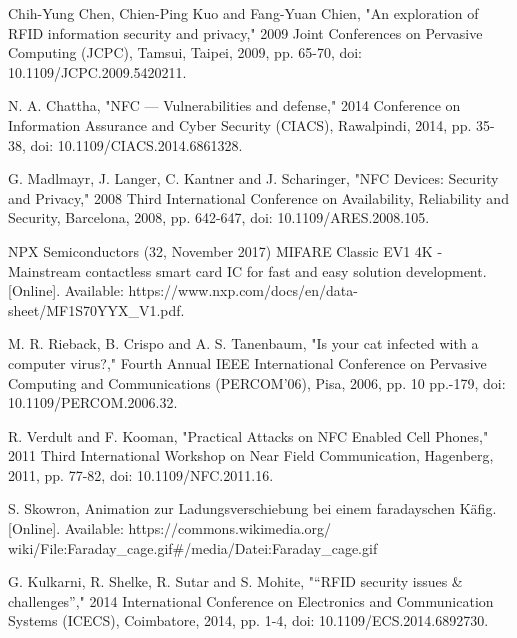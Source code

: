 \documentclass[conference]{IEEEtran}
\begin{document}
\begin{thebibliography}{00}
 Chih-Yung Chen, Chien-Ping Kuo and Fang-Yuan Chien, "An exploration of RFID information security and privacy," 2009 Joint Conferences on Pervasive Computing (JCPC), Tamsui, Taipei, 2009, pp. 65-70, doi: 10.1109/JCPC.2009.5420211.

 N. A. Chattha, "NFC — Vulnerabilities and defense," 2014 Conference on Information Assurance and Cyber Security (CIACS), Rawalpindi, 2014, pp. 35-38, doi: 10.1109/CIACS.2014.6861328.

 G. Madlmayr, J. Langer, C. Kantner and J. Scharinger, "NFC Devices: Security and Privacy," 2008 Third International Conference on Availability, Reliability and Security, Barcelona, 2008, pp. 642-647, doi: 10.1109/ARES.2008.105.

 NPX Semiconductors (32, November 2017) MIFARE Classic EV1 4K - Mainstream contactless smart card IC for fast and easy solution development. [Online]. Available: https://www.nxp.com/docs/en/data-sheet/MF1S70YYX\_V1.pdf.

 M. R. Rieback, B. Crispo and A. S. Tanenbaum, "Is your cat infected with a computer virus?," Fourth Annual IEEE International Conference on Pervasive Computing and Communications (PERCOM'06), Pisa, 2006, pp. 10 pp.-179, doi: 10.1109/PERCOM.2006.32.

 R. Verdult and F. Kooman, "Practical Attacks on NFC Enabled Cell Phones," 2011 Third International Workshop on Near Field Communication, Hagenberg, 2011, pp. 77-82, doi: 10.1109/NFC.2011.16.

 S. Skowron, Animation zur Ladungsverschiebung bei einem faradayschen Käfig. [Online]. Available: https://commons.wikimedia.org/ wiki/File:Faraday\_cage.gif\#/media/Datei:Faraday\_cage.gif

 G. Kulkarni, R. Shelke, R. Sutar and S. Mohite, "“RFID security issues \& challenges”," 2014 International Conference on Electronics and Communication Systems (ICECS), Coimbatore, 2014, pp. 1-4, doi: 10.1109/ECS.2014.6892730.

\end{thebibliography}
\end{document}
